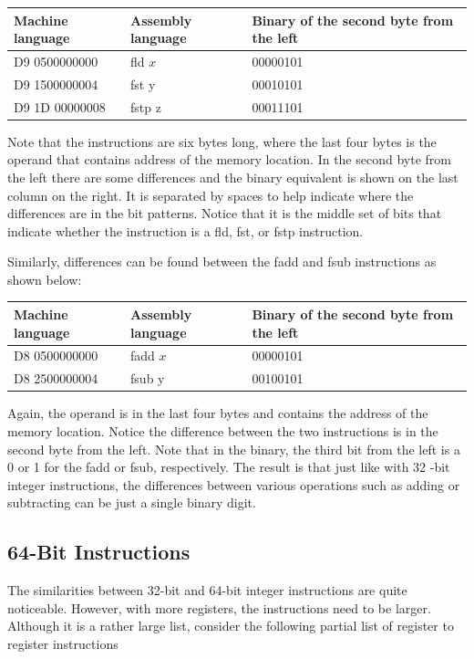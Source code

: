 \documentclass[10pt]{book}
\begin{document}
\begin{center}
\begin{tabular}{|l|l|l|}
\hline
Machine language & Assembly language & Binary of the second byte from the left \\
\hline
D9 0500000000 & fld $x$ & 00000101 \\
\hline
D9 1500000004 & fst y & 00010101 \\
\hline
D9 1D 00000008 & fstp z & 00011101 \\
\hline
\end{tabular}
\end{center}

Note that the instructions are six bytes long, where the last four bytes is the operand that contains address of the memory location. In the second byte from the left there are some differences and the binary equivalent is shown on the last column on the right. It is separated by spaces to help indicate where the differences are in the bit patterns. Notice that it is the middle set of bits that indicate whether the instruction is a fld, fst, or fstp instruction.

Similarly, differences can be found between the fadd and fsub instructions as shown below:

\begin{center}
\begin{tabular}{|l|l|l|}
\hline
Machine language & Assembly language & Binary of the second byte from the left \\
\hline
D8 0500000000 & fadd $x$ & 00000101 \\
\hline
D8 2500000004 & fsub y & 00100101 \\
\hline
\end{tabular}
\end{center}

Again, the operand is in the last four bytes and contains the address of the memory location. Notice the difference between the two instructions is in the second byte from the left. Note that in the binary, the third bit from the left is a 0 or 1 for the fadd or fsub, respectively. The result is that just like with 32 -bit integer instructions, the differences between various operations such as adding or subtracting can be just a single binary digit.

\subsection{64-Bit Instructions}
The similarities between 32-bit and 64-bit integer instructions are quite noticeable. However, with more registers, the instructions need to be larger. Although it is a rather large list, consider the following partial list of register to register instructions
\end{document}
